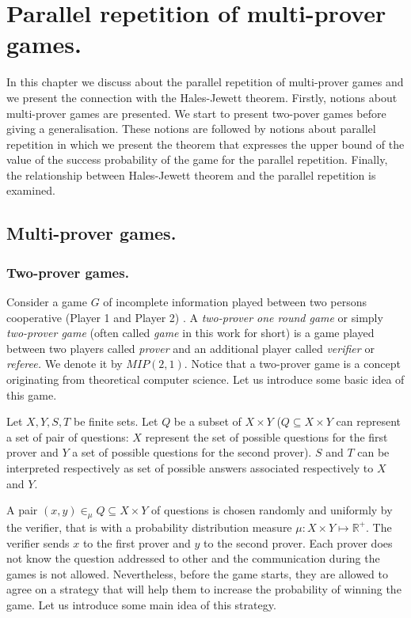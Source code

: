 \chapter{Parallel repetition of multi-prover games.}

In this chapter we discuss about the parallel repetition of multi-prover games and we present the connection with the Hales-Jewett theorem. Firstly, notions about multi-prover games are presented. We start to present two-pover games before giving a generalisation.
These notions are followed by notions about parallel repetition in which we present the theorem that expresses the upper bound of the value of the success probability of the game for the parallel repetition. Finally, the relationship between
Hales-Jewett theorem and the parallel repetition  is examined.


\section{Multi-prover games.}


\subsection{Two-prover games.} \label{tpg}

Consider a game $G$  of incomplete information played between two persons cooperative (Player 1 and Player 2)
\citep{verbitsky1996towards, raz2010parallel}. A \textit{two-prover one round  game} or simply \textit{two-prover game} (often called \textit{game} in this work for short) is a game played between two players called \textit{prover} and an additional player called \textit{verifier} or \textit{referee.}
We denote it by $MIP(2,1)$.
Notice that a two-prover game is a concept originating from theoretical computer science. Let us introduce some basic idea of this game.

Let $X, Y, S, T$ be  finite sets. Let $Q$ be a subset of $X\times Y$ ($Q \subseteq X \times Y$ can represent a set of pair of questions: $X$ represent the set of possible questions for the first prover and $Y$ a set of possible questions for the second prover).    $S$ and $T$ can be interpreted respectively as set of possible answers associated respectively to $X$ and $Y$.

A pair $(x,y) \in_{\mu} Q \subseteq X\times Y$ of questions is chosen randomly and uniformly by the verifier, that is with a probability distribution measure $\mu: X \times Y \longmapsto \mathbb{R}^+.$
The verifier sends $x$ to the first prover and $y$ to the second prover. Each prover does not know the question addressed to other and the communication during the games is not allowed. Nevertheless, before the game starts, they are allowed to agree on a strategy that will help them to increase the probability of winning the game. Let us introduce some main idea of this strategy. 

